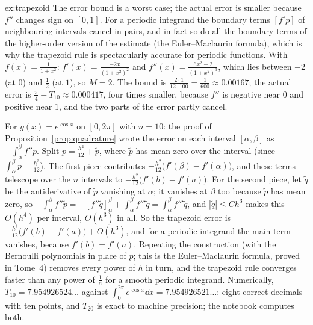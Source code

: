 \begin{solution}{ex:trapezoid}
\idea The error bound is a worst case; the actual error is smaller because $f''$ changes sign on $[0,1]$. For a periodic integrand the boundary terms $[f'p]$ of neighbouring intervals cancel in pairs, and in fact so do all the boundary terms of the higher-order version of the estimate (the Euler--Maclaurin formula), which is why the trapezoid rule is spectacularly accurate for periodic functions.
\writeup With $f(x)=\frac1{1+x^2}$: $f'(x)=\frac{-2x}{(1+x^2)^2}$ and $f''(x)=\frac{6x^2-2}{(1+x^2)^3}$, which lies between $-2$ (at $0$) and $\frac12$ (at $1$), so $M=2$. The bound is $\frac{2\cdot1}{12\cdot100}=\frac1{600}\approx0.00167$; the actual error is $\frac\pi4-T_{10}\approx0.000417$, four times smaller, because $f''$ is negative near $0$ and positive near $1$, and the two parts of the error partly cancel.

For $g(x)=e^{\cos x}$ on $[0,2\pi]$ with $n=10$: the proof of Proposition~\ref{prop:quadrature} wrote the error on each interval $[\alpha,\beta]$ as $-\int_\alpha^\beta f''p$. Split $p=\frac{h^2}{12}+\tilde p$, where $\tilde p$ has mean zero over the interval (since $\int_\alpha^\beta p=\frac{h^3}{12}$). The first piece contributes $-\frac{h^2}{12}\bigl(f'(\beta)-f'(\alpha)\bigr)$, and these terms telescope over the $n$ intervals to $-\frac{h^2}{12}\bigl(f'(b)-f'(a)\bigr)$. For the second piece, let $\tilde q$ be the antiderivative of $\tilde p$ vanishing at $\alpha$; it vanishes at $\beta$ too because $\tilde p$ has mean zero, so $-\int_\alpha^\beta f''\tilde p=-\left[f''\tilde q\right]_\alpha^\beta+\int_\alpha^\beta f'''\tilde q=\int_\alpha^\beta f'''\tilde q$, and $|\tilde q|\le Ch^3$ makes this $O(h^4)$ per interval, $O(h^3)$ in all. So the trapezoid error is $-\frac{h^2}{12}\bigl(f'(b)-f'(a)\bigr)+O(h^3)$, and for a periodic integrand the main term vanishes, because $f'(b)=f'(a)$. Repeating the construction (with the Bernoulli polynomials in place of $p$; this is the Euler--Maclaurin formula, proved in Tome~4) removes every power of $h$ in turn, and the trapezoid rule converges faster than any power of $\frac1n$ for a smooth periodic integrand. Numerically, $T_{10}=7.954926524\ldots$ against $\int_0^{2\pi}e^{\cos x}\dd x=7.954926521\ldots$: eight correct decimals with ten points, and $T_{20}$ is exact to machine precision; the notebook computes both.
\end{solution}

